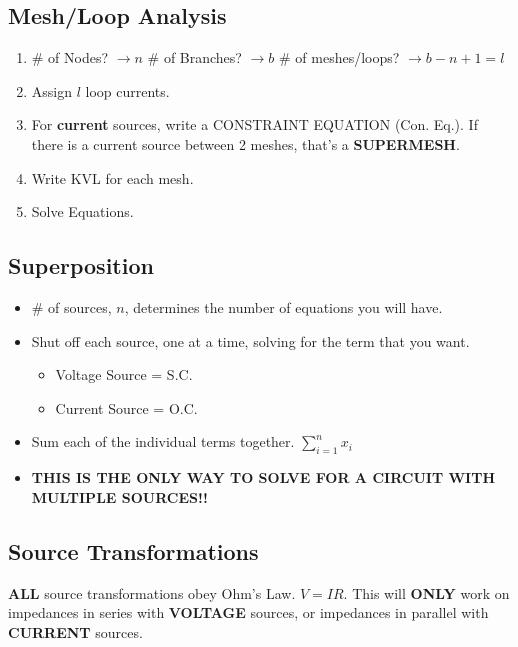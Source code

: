 \documentclass[10pt,letterpaper,final,twoside,notitlepage]{article}
\begin{document}
	\subsection*{Mesh/Loop Analysis} \label{subsec:Mesh Analysis}
		\begin{enumerate}
			\item \# of Nodes? $\rightarrow n$ \# of Branches? $\rightarrow b$ \# of meshes/loops? $\rightarrow b-n+1 = l$
			\item Assign $l$ loop currents.
			\item For \textbf{current} sources, write a CONSTRAINT EQUATION (Con. Eq.). If there is a current source between 2 meshes, that's a \textbf{SUPERMESH}.
			\item Write KVL for each mesh.
			\item Solve Equations.
		\end{enumerate}
	\subsection*{Superposition} \label{subsec:Superposition}
		\begin{itemize}[noitemsep, nolistsep]
			\item \# of sources, $n$, determines the number of equations you will have.
			\item Shut off each source, one at a time, solving for the term that you want.
			\begin{itemize}[noitemsep, nolistsep]
				\item Voltage Source = S.C.
				\item Current Source = O.C.
			\end{itemize}
			\item Sum each of the individual terms together. $\sum_{i=1}^{n} x_{i}$ \vspace{1.5mm}
			\item \textbf{\large THIS IS THE ONLY WAY TO SOLVE FOR A CIRCUIT WITH MULTIPLE SOURCES!!}
		\end{itemize}

	\subsection*{Source Transformations} \label{sec:Source Transforms}
		\textbf{ALL} source transformations obey Ohm's Law. $V=IR$.
		This will \textbf{ONLY} work on impedances in series with \textbf{VOLTAGE} sources, or impedances in parallel with \textbf{CURRENT} sources.
		\vspace{-5mm}
		
\end{document}
